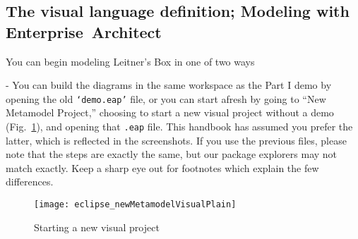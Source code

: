 \visHeader
\subsection[The visual language definition: Modeling with Diagrams]{The visual language definition; Modeling with \mbox{Enterprise Architect}}
\hypertarget{sec:static vis}{}

\vspace{0.5cm}

\hypertarget{static vis}{You can begin modeling Leitner's Box in one of two ways} - You can build the diagrams in the same workspace as the Part I demo by
opening the old \texttt{`demo.eap'} file, or you can start afresh by going to ``New Metamodel Project,'' choosing to start a new visual project without a demo
(Fig.~\ref{fig:new_visModel}), and opening that \texttt{.eap} file. This handbook has assumed you prefer the latter, which is reflected in the screenshots.
If you use the previous files, please note that the steps are exactly the same, but our package explorers may not match exactly. Keep a sharp eye out for
footnotes which explain the few differences.

\begin{figure}[htbp]
	\centering
  \texttt{[image: eclipse\_newMetamodelVisualPlain]}
	\caption{Starting a new visual project}
	\label{fig:new_visModel}
\end{figure}

